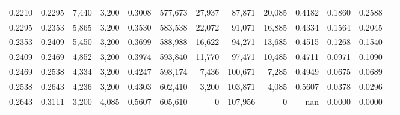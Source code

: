 \begin{tabular}{rrrrrrrrrrrrr}
0.2210 & 0.2295 &  7,440 & 3,200 &                                     0.3008 & 577,673 &  27,937 &  87,871 &  20,085 & 0.4182 & 0.1860 & 0.2588 \\
0.2295 & 0.2353 &  5,865 & 3,200 &                                     0.3530 & 583,538 &  22,072 &  91,071 &  16,885 & 0.4334 & 0.1564 & 0.2045 \\
0.2353 & 0.2409 &  5,450 & 3,200 &                                     0.3699 & 588,988 &  16,622 &  94,271 &  13,685 & 0.4515 & 0.1268 & 0.1540 \\
0.2409 & 0.2469 &  4,852 & 3,200 &                                     0.3974 & 593,840 &  11,770 &  97,471 &  10,485 & 0.4711 & 0.0971 & 0.1090 \\
0.2469 & 0.2538 &  4,334 & 3,200 &                                     0.4247 & 598,174 &   7,436 & 100,671 &   7,285 & 0.4949 & 0.0675 & 0.0689 \\
0.2538 & 0.2643 &  4,236 & 3,200 &                                     0.4303 & 602,410 &   3,200 & 103,871 &   4,085 & 0.5607 & 0.0378 & 0.0296 \\
0.2643 & 0.3111 &  3,200 & 4,085 &                                     0.5607 & 605,610 &       0 & 107,956 &       0 &    nan & 0.0000 & 0.0000 \\
\bottomrule
\end{tabular}
